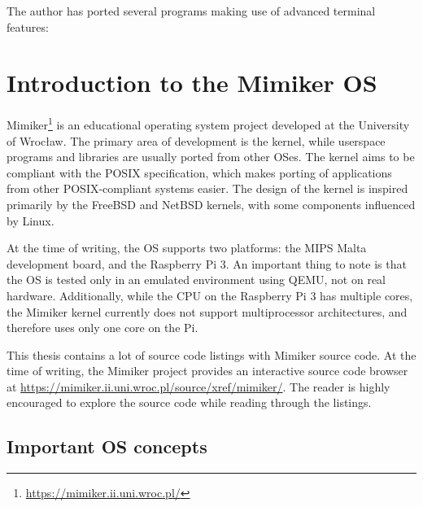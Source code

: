 \documentclass[shortabstract, manyadvisors, english, mgr]{iithesis}
\begin{document}
The author has ported several programs making use of advanced terminal features:

\section{Introduction to the Mimiker OS}

Mimiker\footnote{\url{https://mimiker.ii.uni.wroc.pl/}} is an educational
operating system project developed at the University of Wrocław. The primary
area of development is the kernel, while userspace programs and libraries are
usually ported from other OSes. The kernel aims to be compliant with the POSIX
specification, which makes porting of applications from other POSIX-compliant
systems easier. The design of the kernel is inspired primarily by the FreeBSD
and NetBSD kernels, with some components influenced by Linux.

At the time of writing, the OS supports two platforms: the MIPS Malta
development board, and the Raspberry Pi 3. An important thing to note is that
the OS is tested only in an emulated environment using QEMU, not on real
hardware. Additionally, while the CPU on the Raspberry Pi 3 has multiple cores,
the Mimiker kernel currently does not support multiprocessor architectures,
and therefore uses only one core on the Pi.

This thesis contains a lot of source code listings with Mimiker source code. At
the time of writing, the Mimiker project provides an interactive source code
browser at \url{https://mimiker.ii.uni.wroc.pl/source/xref/mimiker/}. The reader
is highly encouraged to explore the source code while reading through the
listings.

\subsection{Important OS concepts}
\end{document}
